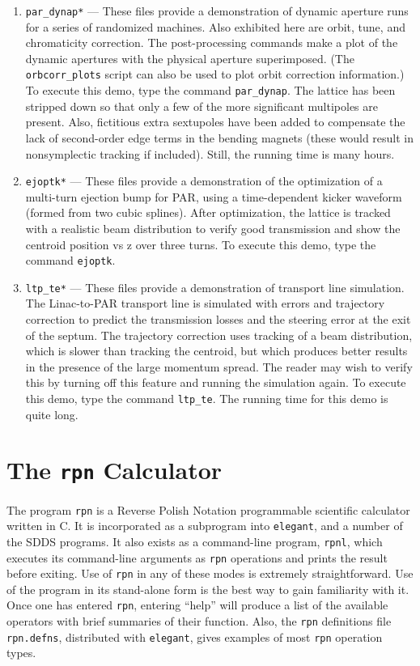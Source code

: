 \documentclass[11pt]{article}
\begin{document}
\begin{enumerate}
\item \verb|par_dynap*| --- These files provide a demonstration of
dynamic aperture runs for a series of randomized machines.  Also
exhibited here are orbit, tune, and chromaticity correction.  The
post-processing commands make a plot of the dynamic apertures with the
physical aperture superimposed.  (The \verb|orbcorr_plots| script can
also be used to plot orbit correction information.) To execute this
demo, type the command \verb|par_dynap|.  The lattice has been
stripped down so that only a few of the more significant multipoles
are present.  Also, fictitious extra sextupoles have been added to
compensate the lack of second-order edge terms in the bending magnets
(these would result in nonsymplectic tracking if included).  Still,
the running time is many hours.

\item \verb|ejoptk*| --- These files provide a demonstration of the
optimization of a multi-turn ejection bump for PAR, using a
time-dependent kicker waveform (formed from two cubic splines).  After
optimization, the lattice is tracked with a realistic beam
distribution to verify good transmission and show the centroid
position vs z over three turns.  To execute this demo, type the
command \verb|ejoptk|.

\item \verb|ltp_te*| --- These files provide a demonstration of
transport line simulation.  The Linac-to-PAR transport line is
simulated with errors and trajectory correction to predict the
transmission losses and the steering error at the exit of the septum.
The trajectory correction uses tracking of a beam distribution, which
is slower than tracking the centroid, but which produces better
results in the presence of the large momentum spread.  The reader may
wish to verify this by turning off this feature and running the
simulation again.  To execute this demo, type the command
\verb|ltp_te|.  The running time for this demo is quite long.

\end{enumerate}

\newpage
\section{The {\tt rpn} Calculator}

The program {\tt rpn} is a Reverse Polish Notation programmable
scientific calculator written in C.  It is incorporated as a
subprogram into {\tt elegant}, and a number of the SDDS programs.  It
also exists as a command-line program, {\tt rpnl}, which executes its
command-line arguments as {\tt rpn} operations and prints the result
before exiting.  Use of {\tt rpn} in any of these modes is extremely
straightforward.  Use of the program in its stand-alone form is the
best way to gain familiarity with it.  Once one has entered {\tt rpn},
entering ``help'' will produce a list of the available operators with
brief summaries of their function.  Also, the {\tt rpn} definitions
file \verb|rpn.defns|, distributed with {\tt elegant}, gives examples
of most {\tt rpn} operation types.
\end{document}
